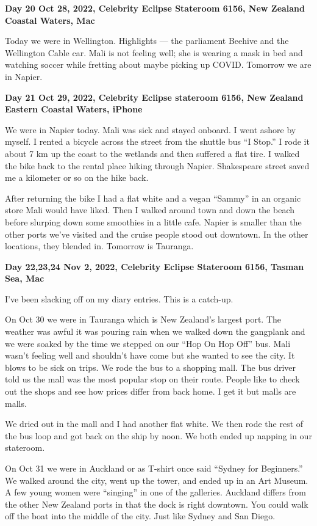 \textbf{Day 20 Oct 28, 2022, Celebrity Eclipse Stateroom 6156, New Zealand Coastal Waters, Mac}

Today we were in Wellington. Highlights --- the parliament Beehive and
the Wellington Cable car. Mali is not feeling well; she is wearing a
mask in bed and watching soccer while fretting about maybe picking up
COVID. Tomorrow we are in Napier.

\textbf{Day 21 Oct 29, 2022, Celebrity Eclipse stateroom 6156, New Zealand Eastern Coastal Waters, iPhone}

We were in Napier today. Mali was sick and stayed onboard. I went ashore
by myself. I rented a bicycle across the street from the shuttle bus ``I
Stop.'' I rode it about 7 km up the coast to the wetlands and then
suffered a flat tire. I walked the bike back to the rental place hiking
through Napier. Shakespeare street saved me a kilometer or so on the
hike back.

After returning the bike I had a flat white and a vegan ``Sammy'' in an
organic store Mali would have liked. Then I walked around town and down
the beach before slurping down some smoothies in a little cafe. Napier
is smaller than the other ports we've visited and the cruise people
stood out downtown. In the other locations, they blended in. Tomorrow is
Tauranga.

\textbf{Day 22,23,24 Nov 2, 2022, Celebrity Eclipse Stateroom 6156, Tasman Sea, Mac}

I've been slacking off on my diary entries. This is a catch-up.

On Oct 30 we were in Tauranga which is New Zealand's largest port. The
weather was awful it was pouring rain when we walked down the gangplank
and we were soaked by the time we stepped on our ``Hop On Hop Off'' bus.
Mali wasn't feeling well and shouldn't have come but she wanted to see
the city. It blows to be sick on trips. We rode the bus to a shopping
mall. The bus driver told us the mall was the most popular stop on their
route. People like to check out the shops and see how prices differ from
back home. I get it but malls are malls.

We dried out in the mall and I had another flat white. We then rode the
rest of the bus loop and got back on the ship by noon. We both ended up
napping in our stateroom.

On Oct 31 we were in Auckland or as T-shirt once said ``Sydney for
Beginners.'' We walked around the city, went up the tower, and ended up
in an Art Museum. A few young women were ``singing'' in one of the
galleries. Auckland differs from the other New Zealand ports in that the
dock is right downtown. You could walk off the boat into the middle of
the city. Just like Sydney and San Diego.

